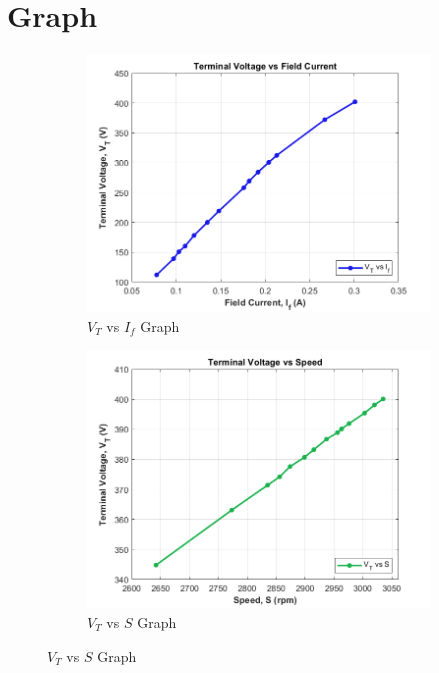 \documentclass[a4paper,12pt]{article}
\begin{document}
\section{Graph}
	\begin{figure}[H]
	\centering
	\begin{subfigure}[t]{1\textwidth}
		\centering
		\includegraphics[width=.94\linewidth]{Images/1}
		\caption{$V_T$ vs $I_f$ Graph }
	
	\end{subfigure}
	
	\begin{subfigure}[t]{1\textwidth}
		\centering
		\includegraphics[width=.94\linewidth]{Images/2}
		\caption{ $V_T$ vs $S$ Graph}
	\end{subfigure}
	
	
\end{figure}
	
\end{document}
